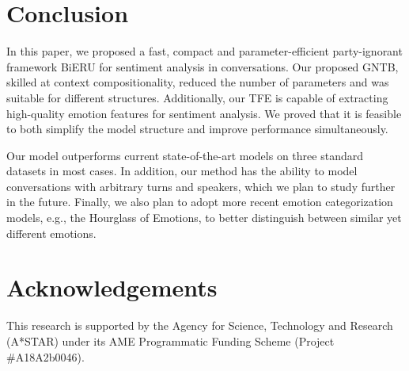 \documentclass[journal]{IEEEtran}
\begin{document}
\section{Conclusion}
\label{sec:conclusion}
In this paper, we proposed a fast, compact and parameter-efficient party-ignorant framework BiERU for sentiment analysis in conversations. Our proposed GNTB, skilled at context compositionality, reduced the number of parameters and was suitable for different structures. Additionally, our TFE is capable of extracting high-quality emotion features for sentiment analysis. We proved that it is feasible to both simplify the model structure and improve performance simultaneously.

Our model outperforms current state-of-the-art models on three standard datasets in most cases. In addition, our method has the ability to model conversations with arbitrary turns and speakers, which we plan to study further in the future. Finally, we also plan to adopt more recent emotion categorization models, e.g., the Hourglass of Emotions, to better distinguish between similar yet different emotions.


\section*{Acknowledgements}
This research is supported by the Agency for Science, Technology and Research (A*STAR) under its AME Programmatic Funding Scheme (Project \#A18A2b0046).
\end{document}

